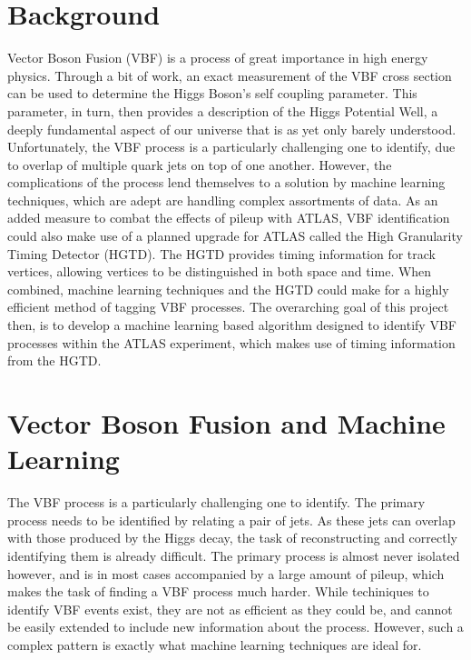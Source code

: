 \documentclass[paper=a4,fontsize=12pt]{article}
\begin{document}
\section*{Background}
    Vector Boson Fusion (VBF) is a process of great importance in high energy physics. Through a bit of work, an exact measurement of the VBF cross section can be used to determine the Higgs Boson's self coupling parameter. This parameter, in turn, then provides a description of the Higgs Potential Well, a deeply fundamental aspect of our universe that is as yet only barely understood. Unfortunately, the VBF process is a particularly challenging one to identify, due to overlap of multiple quark jets on top of one another. However, the complications of the process lend themselves to a solution by machine learning techniques, which are adept are handling complex assortments of data. As an added measure to combat the effects of pileup with ATLAS, VBF identification could also make use of a planned upgrade for ATLAS called the High Granularity Timing Detector (HGTD). The HGTD provides timing information for track vertices, allowing vertices to be distinguished in both space and time. When combined, machine learning techniques and the HGTD could make for a highly efficient method of tagging VBF processes. The overarching goal of this project then, is to develop a machine learning based algorithm designed to identify VBF processes within the ATLAS experiment, which makes use of timing information from the HGTD.



\section*{Vector Boson Fusion and Machine Learning}
    The VBF process is a particularly challenging one to identify. The primary process needs to be identified by relating a pair of jets. As these jets can overlap with those produced by the Higgs decay, the task of reconstructing and correctly identifying them is already difficult. The primary process is almost never isolated however, and is in most cases accompanied by a large amount of pileup, which makes the task of finding a VBF process much harder. While techiniques to identify VBF events exist, they are not as efficient as they could be, and cannot be easily extended to include new information about the process. However, such a complex pattern is exactly what machine learning techniques are ideal for. 
\end{document}
